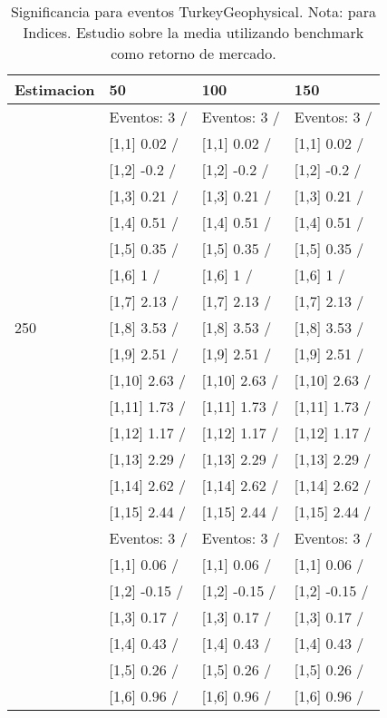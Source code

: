 \begin{table}

\caption{Significancia para eventos TurkeyGeophysical. Nota: para Indices. Estudio sobre la media utilizando benchmark como retorno de mercado.}
\centering
\begin{tabular}[t]{llll}
\toprule
Estimacion & 50 & 100 & 150\\
\midrule
 & Eventos:  3 / & Eventos:  3 / & Eventos:  3 /\\
 & {}[1,1] 0.02  / & {}[1,1] 0.02  / & {}[1,1] 0.02  /\\
 & {}[1,2] -0.2  / & {}[1,2] -0.2  / & {}[1,2] -0.2  /\\
 & {}[1,3] 0.21  / & {}[1,3] 0.21  / & {}[1,3] 0.21  /\\
 & {}[1,4] 0.51  / & {}[1,4] 0.51  / & {}[1,4] 0.51  /\\
\addlinespace
 & {}[1,5] 0.35  / & {}[1,5] 0.35  / & {}[1,5] 0.35  /\\
 & {}[1,6] 1  / & {}[1,6] 1  / & {}[1,6] 1  /\\
 & {}[1,7] 2.13  / & {}[1,7] 2.13  / & {}[1,7] 2.13  /\\
250 & {}[1,8] 3.53  / & {}[1,8] 3.53  / & {}[1,8] 3.53  /\\
 & {}[1,9] 2.51  / & {}[1,9] 2.51  / & {}[1,9] 2.51  /\\
\addlinespace
 & {}[1,10] 2.63  / & {}[1,10] 2.63  / & {}[1,10] 2.63  /\\
 & {}[1,11] 1.73  / & {}[1,11] 1.73  / & {}[1,11] 1.73  /\\
 & {}[1,12] 1.17  / & {}[1,12] 1.17  / & {}[1,12] 1.17  /\\
 & {}[1,13] 2.29  / & {}[1,13] 2.29  / & {}[1,13] 2.29  /\\
 & {}[1,14] 2.62  / & {}[1,14] 2.62  / & {}[1,14] 2.62  /\\
\addlinespace
 & {}[1,15] 2.44  / & {}[1,15] 2.44  / & {}[1,15] 2.44  /\\
 & Eventos:  3 / & Eventos:  3 / & Eventos:  3 /\\
 & {}[1,1] 0.06  / & {}[1,1] 0.06  / & {}[1,1] 0.06  /\\
 & {}[1,2] -0.15  / & {}[1,2] -0.15  / & {}[1,2] -0.15  /\\
 & {}[1,3] 0.17  / & {}[1,3] 0.17  / & {}[1,3] 0.17  /\\
\addlinespace
 & {}[1,4] 0.43  / & {}[1,4] 0.43  / & {}[1,4] 0.43  /\\
 & {}[1,5] 0.26  / & {}[1,5] 0.26  / & {}[1,5] 0.26  /\\
 & {}[1,6] 0.96  / & {}[1,6] 0.96  / & {}[1,6] 0.96  /\\

\end{tabular}
\end{table}
